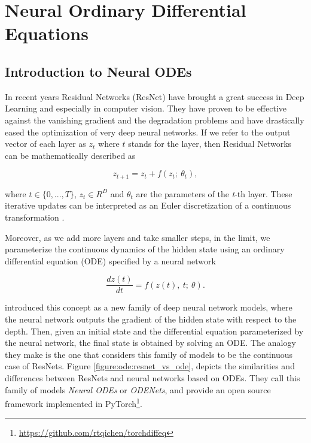 \chapter{Neural Ordinary Differential Equations}
\label{chapter:ode}

\section{Introduction to Neural ODEs}
\label{section:ode:introduction}

In recent years Residual Networks (ResNet) \citep{he2016deep} have brought a great success in Deep Learning and especially in computer vision. They have proven to be effective against the vanishing gradient and the degradation problems and have drastically eased the optimization of very deep neural networks. If we refer to the output vector of each layer as $ z_t $ where $ t $ stands for the layer, then Residual Networks can be mathematically described as

\begin{equation}
    \label{equation:ode:resnet}
    z_{t+1} = z_{t} + f(z_{t}; \ \theta_{t}),
\end{equation}

where $ t \in \{0, ..., T\} $, $ z_t \in R^D $ and $ \theta_t $ are the parameters of the \emph{t}-th layer. These iterative updates can be interpreted as an Euler discretization of a continuous transformation \citep{lu2017beyond, haber2017stable, ruthotto2018deep}.

Moreover, as we add more layers and take smaller steps, in the limit, we parameterize the continuous dynamics of the hidden state using an ordinary differential equation (ODE) specified by a neural network

\begin{equation}
    \label{equation:ode:odes}
    \frac{d z(t)}{d t} = f(z(t), \ t; \ \theta ).
\end{equation}

\citet{chen2018neural} introduced this concept as a new family of deep neural network models, where the neural network outputs the gradient of the hidden state with respect to the depth. Then, given an initial state and the differential equation parameterized by the neural network, the final state is obtained by solving an ODE. The analogy they make is the one that considers this family of models to be the continuous case of ResNets. Figure \ref{figure:ode:resnet_vs_ode}, depicts the similarities and differences between ResNets and neural networks based on ODEs. They call this family of models \emph{Neural ODEs} or \emph{ODENets}, and provide an open source framework implemented in PyTorch\footnote{\url{https://github.com/rtqichen/torchdiffeq}}.

